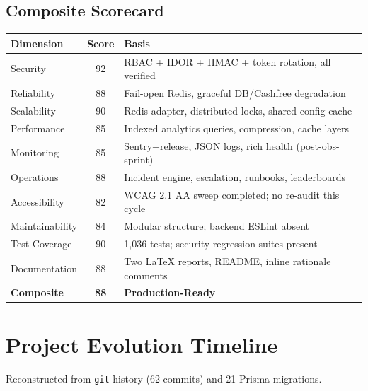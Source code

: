 \documentclass[11pt,a4paper]{article}
\newcommand{\th}[1]{\textbf{\color{white}#1}}
\begin{document}
\subsection{Composite Scorecard}

\begin{center}\small
\begin{tabular}{lcl}
\toprule
\rowcolor{headbg}\th{Dimension} & \th{Score} & \th{Basis} \\
\midrule
Security            & 92 & RBAC + IDOR + HMAC + token rotation, all verified \\
\rowcolor{rowalt}Reliability         & 88 & Fail-open Redis, graceful DB/Cashfree degradation \\
Scalability         & 90 & Redis adapter, distributed locks, shared config cache \\
\rowcolor{rowalt}Performance         & 85 & Indexed analytics queries, compression, cache layers \\
Monitoring          & 85 & Sentry+release, JSON logs, rich health (post-obs-sprint) \\
\rowcolor{rowalt}Operations          & 88 & Incident engine, escalation, runbooks, leaderboards \\
Accessibility       & 82 & WCAG 2.1 AA sweep completed; no re-audit this cycle \\
\rowcolor{rowalt}Maintainability     & 84 & Modular structure; backend ESLint absent \\
Test Coverage       & 90 & 1{,}036 tests; security regression suites present \\
\rowcolor{rowalt}Documentation       & 88 & Two LaTeX reports, README, inline rationale comments \\
\midrule
\textbf{Composite}  & \textbf{88} & \textbf{Production-Ready} \\
\bottomrule
\end{tabular}
\end{center}

\newpage

\section{Project Evolution Timeline}

Reconstructed from \texttt{git} history (62 commits) and 21 Prisma migrations.
\end{document}
